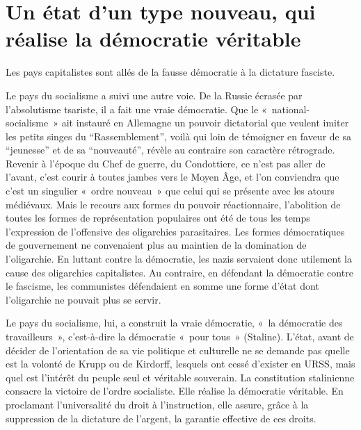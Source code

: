 \documentclass[french,twoside]{book} %
\begin{document}
\section[Un état d’un type nouveau, qui réalise la démocratie véritable]{Un état d’un type nouveau, qui réalise la démocratie véritable}
\noindent Les pays capitalistes sont allés de la fausse démocratie à la dictature fasciste.\par
Le pays du socialisme a suivi une autre voie. De la Russie écrasée par l’absolutisme tsariste, il a fait une vraie démocratie. Que le « national-socialisme » ait instauré en Allemagne un pouvoir dictatorial que veulent imiter les petits singes du “Rassemblement”, voilà qui loin de témoigner en faveur de sa “jeunesse” et de sa “nouveauté”, révèle au contraire son caractère rétrograde. Revenir à l’époque du Chef de guerre, du Condottiere, ce n’est pas aller de l’avant, c’est courir à toutes jambes vers le Moyen Âge, et l’on conviendra que c’est un singulier « ordre nouveau » que celui qui se présente avec les atours médiévaux. Mais le recours aux formes du pouvoir réactionnaire, l’abolition de toutes les formes de représentation populaires ont été de tous les temps l’expression de l’offensive des oligarchies parasitaires. Les formes démocratiques de gouvernement ne convenaient plus au maintien de la domination de l’oligarchie. En luttant contre la démocratie, les nazis servaient donc utilement la cause des oligarchies capitalistes. Au contraire, en défendant la démocratie contre le fascisme, les communistes défendaient en somme une forme d’état dont l’oligarchie ne pouvait plus se servir.\par
Le pays du socialisme, lui, a construit la vraie démocratie, « la démocratie des travailleurs », c’est-à-dire la démocratie « pour tous » (Staline). L’état, avant de décider de l’orientation de sa vie politique et culturelle ne se demande pas quelle est la volonté de Krupp ou de Kirdorff, lesquels ont cessé d’exister en URSS, mais quel est l’intérêt du peuple seul et véritable souverain. La constitution stalinienne consacre la victoire de l’ordre socialiste. Elle réalise la démocratie véritable. En proclamant l’universalité du droit à l’instruction, elle assure, grâce à la suppression de la dictature de l’argent, la garantie effective de ces droits.
\end{document}

